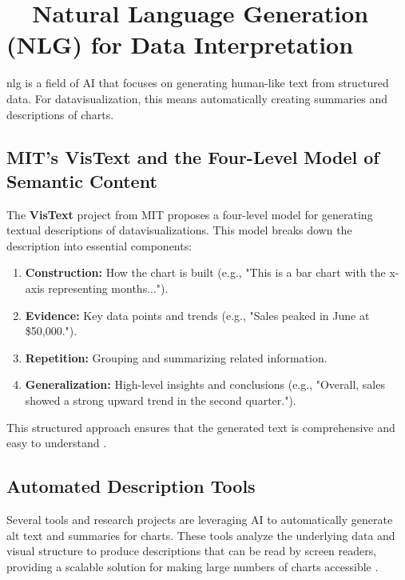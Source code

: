 \section{~~Natural Language Generation (NLG) for Data Interpretation}\label{ch13:sec:nlg}
\gls{nlg} is a field of \gls{AI} that focuses on generating human-like text from structured data. For \gls{datavisualization}, this means automatically creating summaries and descriptions of charts.

\subsection{MIT's VisText and the Four-Level Model of Semantic Content}\label{ch13:ssec:vistext}
The \textbf{VisText} project from MIT proposes a four-level model for generating textual descriptions of \gls{datavisualization}s. This model breaks down the description into essential components:
\begin{enumerate}
	\item \textbf{Construction:} How the chart is built (e.g., "This is a bar chart with the x-axis representing months...").
	\item \textbf{Evidence:} Key data points and trends (e.g., "Sales peaked in June at \$50,000.").
	\item \textbf{Repetition:} Grouping and summarizing related information.
	\item \textbf{Generalization:} High-level insights and conclusions (e.g., "Overall, sales showed a strong upward trend in the second quarter.").
\end{enumerate}
This structured approach ensures that the generated text is comprehensive and easy to understand \supercite{VisText, Lundgard2022Accessible}.

\subsection{Automated Description Tools}\label{ch13:ssec:automated-description}
Several tools and research projects are leveraging \gls{AI} to automatically generate alt text and summaries for charts. These tools analyze the underlying data and visual structure to produce descriptions that can be read by screen readers, providing a scalable solution for making large numbers of charts accessible \supercite{Smits2024AltGosling, SeeChart}.


